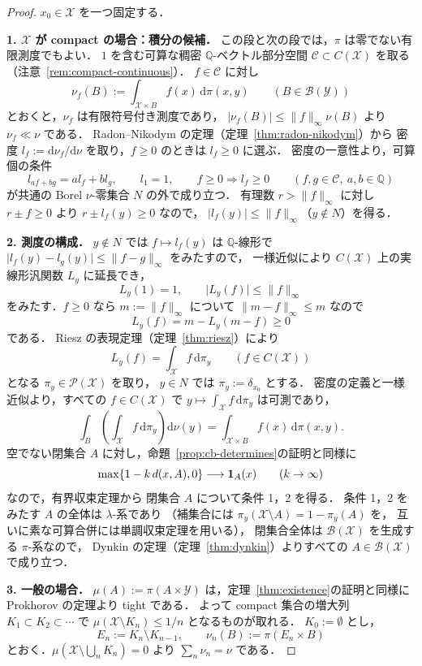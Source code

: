 \documentclass[12pt,a4j,twoside]{jreport}
\numberwithin{equation}{chapter}
\theoremstyle{definition} %
\renewcommand{\max}{\mathop{\rm max}\limits} %
\newcommand{\X}{\mathcal{X}}
\newcommand{\Y}{\mathcal{Y}}
\newcommand{\Borel}{\mathcal{B}}
\newcommand{\Prob}{\mathcal{P}}
\newcommand{\abs}[1]{\lvert #1\rvert}
\renewcommand{\d}{\mathrm{d}} %
\begin{document}
\begin{proof}
  $x_0\in\X$ を一つ固定する．

  \textbf{1. $\X$ が compact の場合：積分の候補．}
  この段と次の段では，$\pi$ は零でない有限測度でもよい．
  $1$ を含む可算な稠密 $\mathbb{Q}$-ベクトル部分空間 $\mathcal{C}\subset C(\X)$ を取る
  （注意~\ref{rem:compact-continuous}）．
  $f\in\mathcal{C}$ に対し
  \[
    \nu_f(B):=\int_{\X\times B}f(x)\,\d\pi(x,y)\qquad(B\in\Borel(\Y))
  \]
  とおくと，$\nu_f$ は有限符号付き測度であり，
  $\abs{\nu_f(B)}\leq\lVert f\rVert_\infty\nu(B)$ より $\nu_f\ll\nu$ である．
  Radon--Nikodym の定理（定理~\ref{thm:radon-nikodym}）から
  密度 $l_f:=\d\nu_f/\d\nu$ を取り，$f\geq0$ のときは $l_f\geq0$ に選ぶ．
  密度の一意性より，可算個の条件
  \[
    l_{af+bg}=al_f+bl_g,\qquad l_1=1,\qquad f\geq0\Rightarrow l_f\geq0
    \qquad(f,g\in\mathcal{C},\ a,b\in\mathbb{Q})
  \]
  が共通の Borel $\nu$-零集合 $N$ の外で成り立つ．
  有理数 $r>\lVert f\rVert_\infty$ に対し $r\pm f\geq0$ より $r\pm l_f(y)\geq0$ なので，
  $\abs{l_f(y)}\leq\lVert f\rVert_\infty$（$y\notin N$）を得る．

  \textbf{2. 測度の構成．}
  $y\notin N$ では $f\mapsto l_f(y)$ は $\mathbb{Q}$-線形で
  $\abs{l_f(y)-l_g(y)}\leq\lVert f-g\rVert_\infty$ をみたすので，
  一様近似により $C(\X)$ 上の実線形汎関数 $L_y$ に延長でき，
  \[
    L_y(1)=1,\qquad\abs{L_y(f)}\leq\lVert f\rVert_\infty
  \]
  をみたす．$f\geq0$ なら $m:=\lVert f\rVert_\infty$ について
  $\lVert m-f\rVert_\infty\leq m$ なので
  \[
    L_y(f)=m-L_y(m-f)\geq0
  \]
  である．
  Riesz の表現定理（定理~\ref{thm:riesz}）により
  \[
    L_y(f)=\int_\X f\,\d\pi_y\qquad(f\in C(\X))
  \]
  となる $\pi_y\in\Prob(\X)$ を取り，
  $y\in N$ では $\pi_y:=\delta_{x_0}$ とする．
  密度の定義と一様近似より，すべての $f\in C(\X)$ で
  $y\mapsto\int_\X f\,\d\pi_y$ は可測であり，
  \[
    \int_B\left(\int_\X f\,\d\pi_y\right)\d\nu(y)=\int_{\X\times B}f(x)\,\d\pi(x,y).
  \]
  空でない閉集合 $A$ に対し，命題~\ref{prop:cb-determines}の証明と同様に
  \[
    \max\{1-k\,d(x,A),0\}\longrightarrow\mathbf{1}_A(x)\qquad(k\to\infty)
  \]
  なので，有界収束定理から
  閉集合 $A$ について条件 1，2 を得る．
  条件 1，2 をみたす $A$ の全体は $\lambda$-系であり
  （補集合には $\pi_y(\X\setminus A)=1-\pi_y(A)$ を，
  互いに素な可算合併には単調収束定理を用いる），
  閉集合全体は $\Borel(\X)$ を生成する $\pi$-系なので，
  Dynkin の定理（定理~\ref{thm:dynkin}）よりすべての $A\in\Borel(\X)$ で成り立つ．

  \textbf{3. 一般の場合．}
  $\mu(A):=\pi(A\times\Y)$ は，定理~\ref{thm:existence}の証明と同様に Prokhorov の定理より tight である．
  よって compact 集合の増大列 $K_1\subset K_2\subset\cdots$ で
  $\mu(\X\setminus K_n)\leq1/n$ となるものが取れる．
  $K_0:=\emptyset$ とし，
  \[
    E_n:=K_n\setminus K_{n-1},\qquad\nu_n(B):=\pi(E_n\times B)
  \]
  とおく．$\mu(\X\setminus\bigcup_nK_n)=0$ より $\sum_n\nu_n=\nu$ である．


\end{proof}
\end{document}
